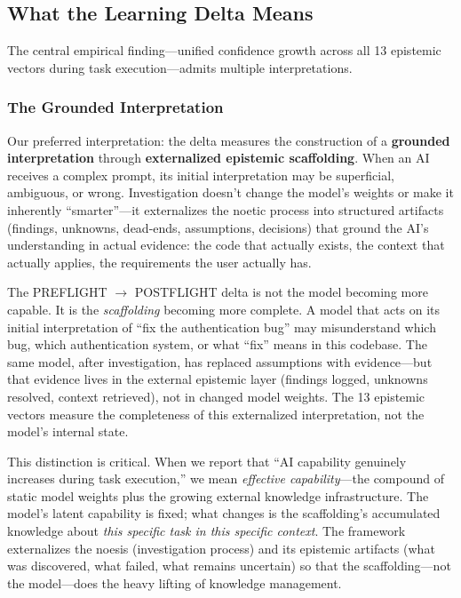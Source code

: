 
\subsection{What the Learning Delta Means}

The central empirical finding---unified confidence growth across all 13 epistemic vectors during task execution---admits multiple interpretations.

\subsubsection{The Grounded Interpretation}

Our preferred interpretation: the delta measures the construction of a \textbf{grounded interpretation} through \textbf{externalized epistemic scaffolding}. When an AI receives a complex prompt, its initial interpretation may be superficial, ambiguous, or wrong. Investigation doesn't change the model's weights or make it inherently ``smarter''---it externalizes the noetic process into structured artifacts (findings, unknowns, dead-ends, assumptions, decisions) that ground the AI's understanding in actual evidence: the code that actually exists, the context that actually applies, the requirements the user actually has.

The PREFLIGHT $\rightarrow$ POSTFLIGHT delta is not the model becoming more capable. It is the \emph{scaffolding} becoming more complete. A model that acts on its initial interpretation of ``fix the authentication bug'' may misunderstand which bug, which authentication system, or what ``fix'' means in this codebase. The same model, after investigation, has replaced assumptions with evidence---but that evidence lives in the external epistemic layer (findings logged, unknowns resolved, context retrieved), not in changed model weights. The 13 epistemic vectors measure the completeness of this externalized interpretation, not the model's internal state.

This distinction is critical. When we report that ``AI capability genuinely increases during task execution,'' we mean \emph{effective capability}---the compound of static model weights plus the growing external knowledge infrastructure. The model's latent capability is fixed; what changes is the scaffolding's accumulated knowledge about \emph{this specific task in this specific context}. The framework externalizes the noesis (investigation process) and its epistemic artifacts (what was discovered, what failed, what remains uncertain) so that the scaffolding---not the model---does the heavy lifting of knowledge management.

